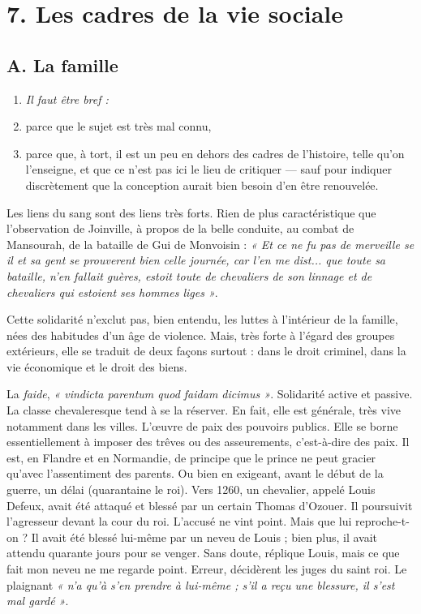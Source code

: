 \documentclass[french,twoside]{book} %
\newlength{\listmod}
\newcommand{\listhead}[1]{\hspace{-1\listmod}\emph{#1}}
\newcommand\chapteropen{} %
\newcommand\chaptercont{} %
\begin{document}
\chapteropen
\chapter[7. Les cadres de la vie sociale]{\textsc{7. }Les cadres de la vie sociale}
\label{c07}

\chaptercont
\section[A. La famille]{A. La famille}
\label{c07a}
\label{p55}
\begin{enumerate}[itemsep=0pt,]
\item[]\listhead{Il faut être bref :}
\item parce que le sujet est très mal connu,
\item parce que, à tort, il est un peu en dehors des cadres de l’histoire, telle qu’on l’enseigne, et que ce n’est pas ici le lieu de critiquer — sauf pour indiquer discrètement que la conception aurait bien besoin d’en être renouvelée.

\end{enumerate}\noindent Les liens du sang sont des liens très forts. Rien de plus caractéristique que l’observation de Joinville, à propos de la belle conduite, au combat de Mansourah, de la bataille de Gui de Monvoisin : \emph{« Et ce ne fu pas de merveille se il et sa gent se prouverent bien celle journée, car l’en me dist... que toute sa bataille, n’en fallait guères, estoit toute de chevaliers de son linnage et de chevaliers qui estoient ses hommes liges »}.\par
Cette solidarité n’exclut pas, bien entendu, les luttes à l’intérieur de la famille, nées des habitudes d’un âge de violence. Mais, très forte à l’égard des groupes extérieurs, elle se traduit de deux façons surtout : dans le droit criminel, dans la vie économique et le droit des biens.\par
La \emph{faide}, \emph{« vindicta parentum quod faidam dicimus »}. Solidarité active et passive. La classe chevaleresque tend à se la réserver. En fait, elle est générale, très vive notamment dans les villes. L’œuvre de paix des pouvoirs publics. Elle se borne essen­tiellement à imposer des trêves ou des asseurements, c’est-à-dire des paix. Il est, en Flandre et en Normandie, de principe que le prince ne peut gracier qu’avec l’assentiment des parents. Ou bien en exigeant, avant le début de la guerre, un délai (quarantaine le roi). Vers 1260, un chevalier, appelé Louis Defeux, avait été attaqué et blessé par un certain Thomas d’Ozouer. Il poursuivit l’agresseur devant la cour du roi. L’accusé ne vint point. Mais que lui reproche­-t-on ? Il avait été blessé lui-même par un neveu de Louis ; bien plus, il avait attendu quarante jours pour se venger. Sans doute, réplique Louis, mais ce que fait mon neveu ne me regarde point. Erreur, décidèrent les juges du saint roi. Le plaignant \emph{« n’a qu’à s’en prendre à lui-même ; s’il a reçu une blessure, il s’est mal gardé »}.\par
\end{document}
